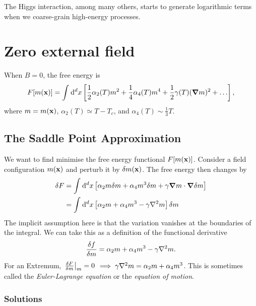\begin{leftbar}
  \begin{remark}
    The Higgs interaction, among many others, starts to generate logarithmic terms when we coarse-grain high-energy processes.
  \end{remark}
\end{leftbar}

\section{Zero external field}%
\label{sec:zero_external_field}

When $B = 0$, the free energy is
\begin{equation}
  F[m(\vb{x})] = \int_{}^{} \dd[d]{x} \left[ \frac{1}{2} \alpha_2(T) m^2 + \frac{1}{4} \alpha_4(T)m^4 + \frac{1}{2} \gamma(T) (\grad m)^2 + \ldots \right],
\end{equation}
where $m = m(\vb{x})$, $\alpha_2(T) \simeq T - T_c$, and $\alpha_4(T) \sim \frac{1}{3}T$.

\subsection{The Saddle Point Approximation}%
\label{sub:the_saddle_point_approximation}

We want to find minimise the free energy functional $F[m(\vb{x})]$.
Consider a field configuration $m(\vb{x})$ and perturb it by $\delta m(\vb{x})$.
The free energy then changes by
\begin{align}
  \delta F &= \int_{}^{} \dd[d]{x} \left[ \alpha_2 m \delta m + \alpha_4 m^3 \delta m + \gamma \grad m \cdot \grad \delta m \right] \\
	   &= \int_{}^{} \dd[d]{x} \left[ \alpha_2 m + \alpha_4 m^3 - \gamma \laplacian m \right] \delta m
\end{align}
The implicit assumption here is that the variation vanishes at the boundaries of the integral.
We can take this as a definition of the functional derivative
\begin{equation}
  \fdv{f}{m} = \alpha_2 m + \alpha_4 m^3 - \gamma \laplacian m.
\end{equation}
For an Extremum, $\left.\fdv{F}{m}\right\rvert_m = 0$ $\implies \gamma \laplacian m = \alpha_2 m + \alpha_4 m^3$. This is sometimes called the \emph{Euler-Lagrange equation} or the \emph{equation of motion}.

\subsubsection{Solutions}%
\label{subsub:solutions}

